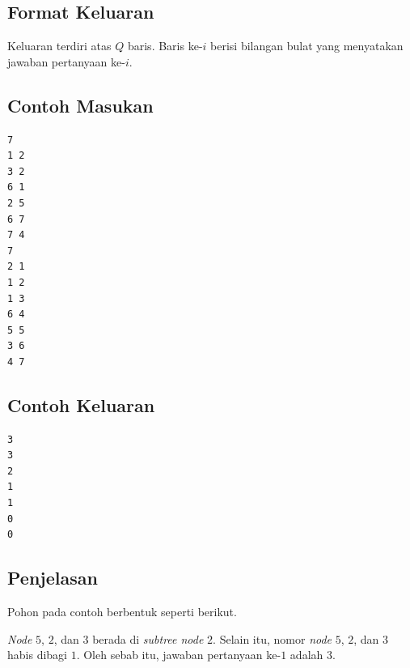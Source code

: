 \documentclass{article}
\begin{document}
\subsection*{Format Keluaran}
Keluaran terdiri atas $Q$ baris. Baris ke-$i$ berisi bilangan bulat yang menyatakan jawaban pertanyaan ke-$i$.

\begin{multicols}{2}
\subsection*{Contoh Masukan}
\begin{lstlisting}
7
1 2
3 2
6 1
2 5
6 7
7 4
7
2 1
1 2
1 3
6 4
5 5
3 6
4 7
\end{lstlisting}
\null
\columnbreak
\subsection*{Contoh Keluaran}
\begin{lstlisting}
3
3
2
1
1
0
0
\end{lstlisting}
\vfill
\null
\end{multicols}

\newpage
\subsection*{Penjelasan}
Pohon pada contoh berbentuk seperti berikut.
\begin{center}
\end{center}
\textit{Node} $5$, $2$, dan $3$ berada di \textit{subtree node} $2$. Selain itu, nomor \textit{node} $5$, $2$, dan $3$ habis dibagi $1$. Oleh sebab itu, jawaban pertanyaan ke-$1$ adalah $3$.
\end{document}
